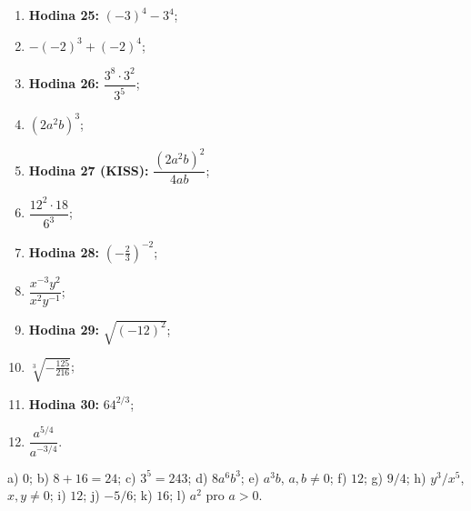 \documentclass[11pt,a4paper]{article}
\begin{document}
\begin{zadaniReseniBox}[title={Domácí úkol 1: mix mocnin a odmocnin (12 úloh)}]
\begin{enumerate}[label=\alph*)]
\item \textbf{Hodina 25:} $(-3)^4-3^4$;
\item $-(-2)^3+(-2)^4$;
\item \textbf{Hodina 26:} $\dfrac{3^8\cdot3^2}{3^5}$;
\item $(2a^2b)^3$;
\item \textbf{Hodina 27 (KISS):} $\dfrac{(2a^2b)^2}{4ab}$;
\item $\dfrac{12^2\cdot18}{6^3}$;
\item \textbf{Hodina 28:} $\left(-\frac23\right)^{-2}$;
\item $\dfrac{x^{-3}y^2}{x^2y^{-1}}$;
\item \textbf{Hodina 29:} $\sqrt{(-12)^2}$;
\item $\sqrt[3]{-\frac{125}{216}}$;
\item \textbf{Hodina 30:} $64^{2/3}$;
\item $\dfrac{a^{5/4}}{a^{-3/4}}$.
\end{enumerate}
\tcblower
 a) $0$; b) $8+16=24$;
 c) $3^5=243$; d) $8a^6b^3$;
 e) $a^3b$, $a,b\ne0$;
 f) $12$;
 g) $9/4$;
 h) $y^3/x^5$, $x,y\ne0$;
 i) $12$; j) $-5/6$;
 k) $16$; l) $a^2$ pro $a>0$.
\end{zadaniReseniBox}
\end{document}
